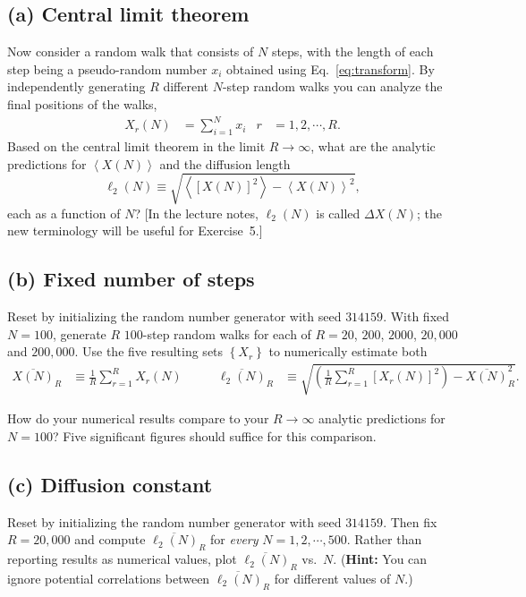\documentclass[12 pt]{article} %
\newcommand{\vev}[1]{\ensuremath{\left\langle #1 \right\rangle} }
\newcommand{\eq}[1]{Eq.~\ref{#1}}
\newcommand{\showmarks}[1]{\rightline{\texttt{[#1 marks]}}} %
\begin{document}
\subsection*{(a) Central limit theorem}
Now consider a random walk that consists of $N$ steps, with the length of each step being a pseudo-random number $x_i$ obtained using \eq{eq:transform}.
By independently generating $R$ different $N$-step random walks you can analyze the final positions of the walks,
\begin{align*}
  X_r(N) & = \sum_{i = 1}^N x_i &
  r & = 1, 2, \cdots, R.
\end{align*}
Based on the central limit theorem in the limit $R \to \infty$, what are the analytic predictions for $\vev{X(N)}$ and the diffusion length
\begin{equation*}
  \ell_2(N) \equiv \sqrt{\vev{\left[X(N)\right]^2} - \vev{X(N)}^2},
\end{equation*}
each as a function of $N$?
[In the lecture notes, $\ell_2(N)$ is called $\Delta X(N)$; the new terminology will be useful for Exercise~5.]

\showmarks{2}

\subsection*{(b) Fixed number of steps}
Reset by initializing the random number generator with seed $314159$. %
With fixed $N = 100$, generate $R$ $100$-step random walks for each of $R = 20$, $200$, $2000$, $20{,}000$ and $200{,}000$.
Use the five resulting sets $\left\{X_r\right\}$ to numerically estimate both
\begin{align*}
  \overline{X(N)}_R & \equiv \frac{1}{R} \sum_{r = 1}^R X_r(N) \qquad &
  \overline{\ell_2(N)}_R & \equiv \sqrt{\left(\frac{1}{R} \sum_{r = 1}^R \left[X_r(N)\right]^2\right) - \overline{X(N)}_R^2}.
\end{align*}

How do your numerical results compare to your $R \to \infty$ analytic predictions for $N = 100$?
Five significant figures should suffice for this comparison.

\showmarks{8}

\subsection*{(c) Diffusion constant}
Reset by initializing the random number generator with seed $314159$. %
Then fix $R = 20{,}000$ and compute $\overline{\ell_2(N)}_R$ for \textit{every} $N = 1, 2, \cdots, 500$.
Rather than reporting results as numerical values, plot $\overline{\ell_2(N)}_R$ vs.\ $N$.
(\textbf{Hint:} You can ignore potential correlations between $\overline{\ell_2(N)}_R$ for different values of $N$.)
\end{document}
